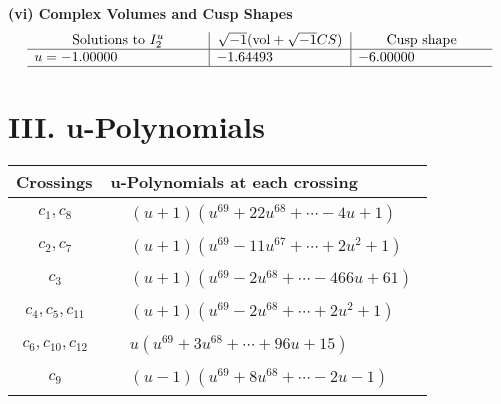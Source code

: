 \documentclass[1p]{elsarticle_modified}
\theoremstyle{definition}
\newcommand{\I}{\sqrt{-1}}
\begin{document}
\newpage\flushleft \textbf{(vi) Complex Volumes and Cusp Shapes}
$$\begin{array}{c|c|c}  
\text{Solutions to }I^u_{2}& \I (\text{vol} + \sqrt{-1}CS) & \text{Cusp shape}\\
 \hline 
\begin{aligned}
u &= -1.00000\phantom{ +0.000000I}\end{aligned}
 & -1.64493\phantom{ +0.000000I} & -6.00000\phantom{ +0.000000I}\\
 \hline 
 \end{array}$$\newpage
\newpage\renewcommand{\arraystretch}{1}
\centering \section*{ III. u-Polynomials}
\begin{tabular}{m{50pt}|m{274pt}}
Crossings & \hspace{64pt}u-Polynomials at each crossing \\
\hline $$\begin{aligned}c_{1},c_{8}\end{aligned}$$&$\begin{aligned}
&(u+1)(u^{69}+22 u^{68}+\cdots-4 u+1)
\end{aligned}$\\
\hline $$\begin{aligned}c_{2},c_{7}\end{aligned}$$&$\begin{aligned}
&(u+1)(u^{69}-11 u^{67}+\cdots+2 u^2+1)
\end{aligned}$\\
\hline $$\begin{aligned}c_{3}\end{aligned}$$&$\begin{aligned}
&(u+1)(u^{69}-2 u^{68}+\cdots-466 u+61)
\end{aligned}$\\
\hline $$\begin{aligned}c_{4},c_{5},c_{11}\end{aligned}$$&$\begin{aligned}
&(u+1)(u^{69}-2 u^{68}+\cdots+2 u^2+1)
\end{aligned}$\\
\hline $$\begin{aligned}c_{6},c_{10},c_{12}\end{aligned}$$&$\begin{aligned}
&u(u^{69}+3 u^{68}+\cdots+96 u+15)
\end{aligned}$\\
\hline $$\begin{aligned}c_{9}\end{aligned}$$&$\begin{aligned}
&(u-1)(u^{69}+8 u^{68}+\cdots-2 u-1)
\end{aligned}$\\
\hline
\end{tabular}\newpage\renewcommand{\arraystretch}{1}
\end{document}
